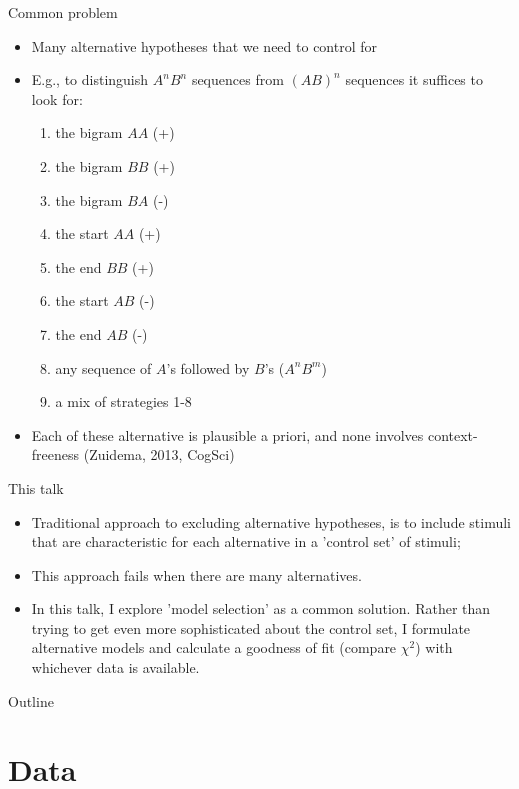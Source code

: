 \documentclass[xcolor=table]{beamer}
\begin{document}
\begin{frame}{Common problem}
  \begin{itemize}[<+->]
  \item Many alternative hypotheses that we need to control for
  \item E.g., to distinguish $A^nB^n$ sequences from $(AB)^n$
    sequences it suffices to look for:
    \begin{enumerate}[<+->]
    \item the bigram $AA$ (+)
    \item the bigram $BB$ (+)
    \item the bigram $BA$ (-)
    \item the start $AA$ (+)
    \item the end $BB$ (+)
    \item the start $AB$ (-)
    \item the end $AB$ (-)
    \item any sequence of $A$'s followed by $B$'s ($A^nB^m$)
    \item a mix of strategies 1-8
    \end{enumerate}
  \item Each of these alternative is plausible a priori, and none
    involves context-freeness (Zuidema, 2013, CogSci)
  \end{itemize}
\end{frame}

\begin{frame}{This talk}
  \begin{itemize}
  \item Traditional approach to excluding alternative hypotheses, is
    to include stimuli that are characteristic for each alternative in
    a 'control set' of stimuli;
  \item This approach fails when there are many alternatives.
  \item In this talk, I explore 'model selection' as a common
    solution. Rather than trying to get even more sophisticated about
    the control set, I formulate alternative models and calculate a
    goodness of fit (compare $\chi^2$) with whichever data is available.
  \end{itemize}

\end{frame}

\begin{frame}{Outline}
\tableofcontents
\end{frame}

\section{Data}
\label{sec:data}
\end{document}
